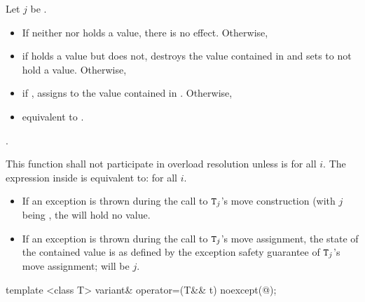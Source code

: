 \begin{itemdescr}
\pnum
Let $j$ be .

\pnum
\effects
\begin{itemize}
\item
If neither  nor  holds a value, there is no effect. Otherwise,
\item
if  holds a value but  does not, destroys the value
contained in  and sets  to not hold a value. Otherwise,
\item
if , assigns  to
the value contained in . Otherwise,
\item
equivalent to .
\end{itemize}

\pnum
\returns {}.

\pnum
\remarks
This function shall not participate in overload resolution unless
 is
 for all $i$.
The expression inside  is equivalent to:
 for all $i$.
\begin{itemize}
\item If an exception is thrown during the call to $\texttt{T}_j$'s move construction
(with $j$ being , the  will hold no value.
\item If an exception is thrown during the call to $\texttt{T}_j$'s move assignment,
the state of the contained value is as defined by the exception safety
guarantee of $\texttt{T}_j$'s move assignment;  will be $j$.
\end{itemize}
\end{itemdescr}

%
\begin{itemdecl}
template <class T> variant& operator=(T&& t) noexcept(@\seebelow@);
\end{itemdecl}

